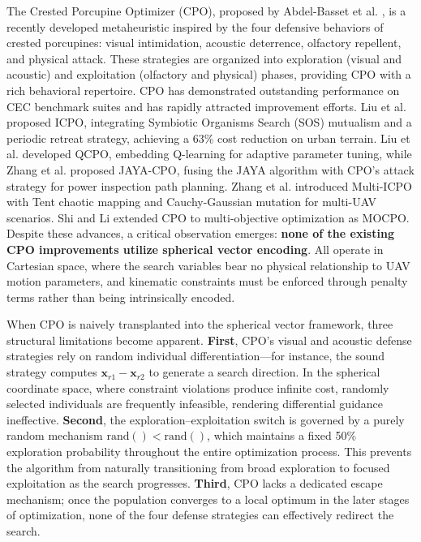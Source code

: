 The Crested Porcupine Optimizer (CPO), proposed by Abdel-Basset et al. \cite{cpo2024}, is a recently developed metaheuristic inspired by the four defensive behaviors of crested porcupines: visual intimidation, acoustic deterrence, olfactory repellent, and physical attack. These strategies are organized into exploration (visual and acoustic) and exploitation (olfactory and physical) phases, providing CPO with a rich behavioral repertoire. CPO has demonstrated outstanding performance on CEC benchmark suites \cite{cpo2024} and has rapidly attracted improvement efforts. Liu et al. \cite{icpo2024} proposed ICPO, integrating Symbiotic Organisms Search (SOS) mutualism and a periodic retreat strategy, achieving a 63\% cost reduction on urban terrain. Liu et al. \cite{qcpo2025} developed QCPO, embedding Q-learning for adaptive parameter tuning, while Zhang et al. \cite{jayacpo2025} proposed JAYA-CPO, fusing the JAYA algorithm with CPO's attack strategy for power inspection path planning. Zhang et al. \cite{multiicpo2026} introduced Multi-ICPO with Tent chaotic mapping and Cauchy-Gaussian mutation for multi-UAV scenarios. Shi and Li \cite{mocpo2026} extended CPO to multi-objective optimization as MOCPO. Despite these advances, a critical observation emerges: \textbf{none of the existing CPO improvements utilize spherical vector encoding}. All operate in Cartesian space, where the search variables bear no physical relationship to UAV motion parameters, and kinematic constraints must be enforced through penalty terms rather than being intrinsically encoded.

When CPO is naively transplanted into the spherical vector framework, three structural limitations become apparent. \textbf{First}, CPO's visual and acoustic defense strategies rely on random individual differentiation—for instance, the sound strategy computes $\mathbf{x}_{r1} - \mathbf{x}_{r2}$ to generate a search direction. In the spherical coordinate space, where constraint violations produce infinite cost, randomly selected individuals are frequently infeasible, rendering differential guidance ineffective. \textbf{Second}, the exploration–exploitation switch is governed by a purely random mechanism $\text{rand}() < \text{rand}()$, which maintains a fixed 50\% exploration probability throughout the entire optimization process. This prevents the algorithm from naturally transitioning from broad exploration to focused exploitation as the search progresses. \textbf{Third}, CPO lacks a dedicated escape mechanism; once the population converges to a local optimum in the later stages of optimization, none of the four defense strategies can effectively redirect the search.

